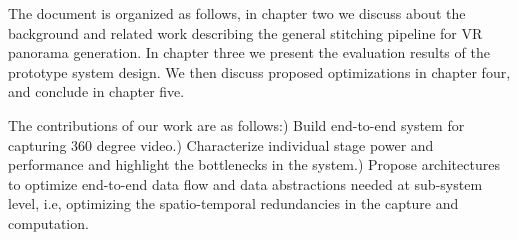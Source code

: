 

The document is organized as follows, in chapter two we discuss about the background and related work describing the general stitching pipeline for VR panorama generation. In chapter three we present the evaluation results of the prototype system design. We then discuss proposed optimizations in chapter four, and conclude in chapter five.

The contributions of our work are as follows:) Build end-to-end system for capturing 360 degree video.) Characterize individual stage power and performance and highlight the bottlenecks in the system.) Propose architectures to optimize end-to-end data flow and data abstractions needed at sub-system level, i.e, optimizing the spatio-temporal redundancies in the capture and computation.\newline